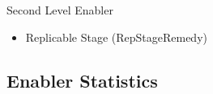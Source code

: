 Second Level Enabler
\begin{itemize}
    \item Replicable Stage (RepStageRemedy)
\end{itemize}

\subsection{Enabler Statistics}











